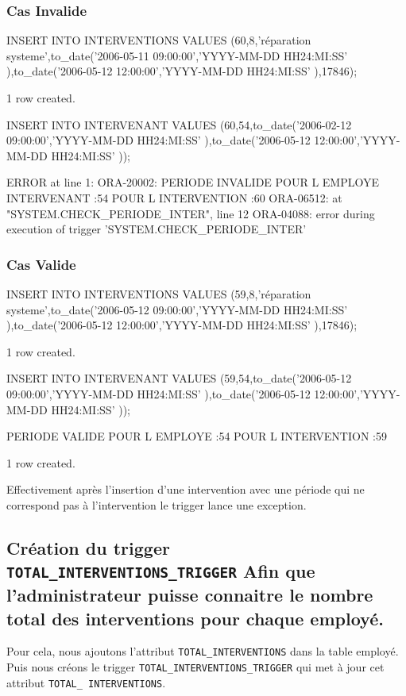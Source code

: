\documentclass[•]{article}
\begin{document}
\subsubsection{Cas Invalide}
\begin{sql}
INSERT INTO INTERVENTIONS VALUES (60,8,'réparation systeme',to_date('2006-05-11 09:00:00','YYYY-MM-DD HH24:MI:SS' ),to_date('2006-05-12 12:00:00','YYYY-MM-DD HH24:MI:SS' ),17846);

1 row created.

INSERT INTO INTERVENANT VALUES (60,54,to_date('2006-02-12 09:00:00','YYYY-MM-DD HH24:MI:SS' ),to_date('2006-05-12 12:00:00','YYYY-MM-DD HH24:MI:SS' ));

ERROR at line 1:
ORA-20002: PERIODE INVALIDE POUR L EMPLOYE INTERVENANT :54  POUR L INTERVENTION
:60
ORA-06512: at "SYSTEM.CHECK_PERIODE_INTER", line 12
ORA-04088: error during execution of trigger 'SYSTEM.CHECK_PERIODE_INTER'
\end{sql}

\subsubsection{Cas Valide}
\begin{sql}
INSERT INTO INTERVENTIONS VALUES (59,8,'réparation systeme',to_date('2006-05-12 09:00:00','YYYY-MM-DD HH24:MI:SS' ),to_date('2006-05-12 12:00:00','YYYY-MM-DD HH24:MI:SS' ),17846);

1 row created.

INSERT INTO INTERVENANT VALUES (59,54,to_date('2006-05-12 09:00:00','YYYY-MM-DD HH24:MI:SS' ),to_date('2006-05-12 12:00:00','YYYY-MM-DD HH24:MI:SS' ));

PERIODE VALIDE POUR L EMPLOYE :54  POUR L INTERVENTION :59

1 row created.
\end{sql}

Effectivement après l'insertion d'une intervention avec une période qui ne correspond pas à l'intervention le trigger lance une exception.

\subsection{Création du trigger \texttt{TOTAL\_INTERVENTIONS\_TRIGGER} Afin que l'administrateur puisse connaitre le nombre total des interventions pour chaque employé.}
 
Pour cela, nous ajoutons l'attribut \texttt{TOTAL\_INTERVENTIONS} dans la table employé.
Puis nous créons le trigger \texttt{TOTAL\_INTERVENTIONS\_TRIGGER} qui met à jour cet attribut \texttt{TOTAL\_ INTERVENTIONS}.
\end{document}
